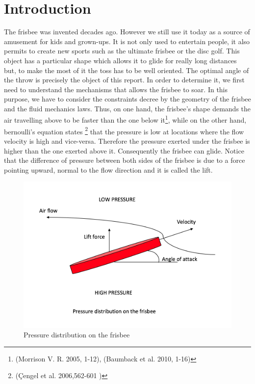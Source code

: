 \documentclass[10pt,a4paper]{report}
\begin{document}
\section{Introduction}
The frisbee was invented decades ago. However we still use it today as a source of amusement for kids and grown-ups. It is not only used to entertain people, it also permits to create new sports such as the ultimate frisbee or the disc golf. This object has a particular shape which allows it to glide for really long distances but, to make the most of it the toss has to be well oriented. The optimal angle of the throw is precisely the object of this report. In order to determine it, we first need to understand the mechanisms that allows the frisbee to soar. In this purpose, we have to consider the constraints decree by the geometry of the frisbee and the fluid mechanics laws. Thus, on one hand, the frisbee's shape demands the air travelling above to be faster than the one below it\footnote{(Morrison V. R. 2005, 1-12), (Baumback et al. 2010, 1-16)}, while on the other hand, bernoulli's equation states \footnote{(\c{C}engel et al. 2006,562-601 )} that the pressure is low at locations where the flow velocity is high and vice-versa. Therefore the pressure exerted under the frisbee is higher than the one exerted above it. Consequently the frisbee can glide. Notice that the difference of pressure between both sides of the frisbee is due to a force pointing upward, normal to the flow direction and it is called the lift. 

\begin{figure}[H]
\centering
\includegraphics[scale=0.6]{Intro.jpg}
\caption{Pressure distribution on the frisbee}
\label{Pressure distribution on the frisbee}
\end{figure}
\end{document}
